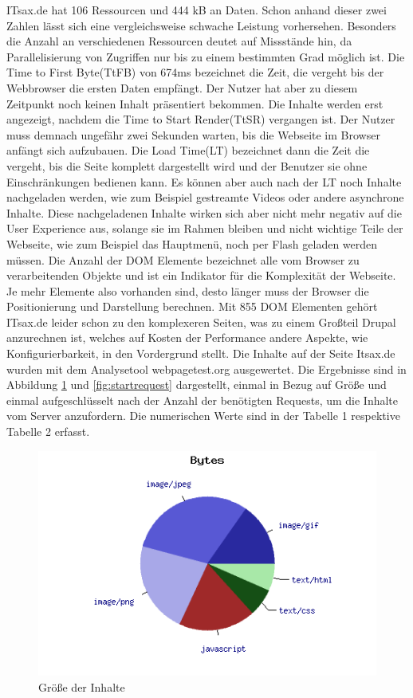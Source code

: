 ITsax.de hat 106 Ressourcen und 444 kB an Daten. Schon anhand dieser zwei Zahlen lässt sich eine vergleichsweise schwache Leistung vorhersehen. Besonders die Anzahl an verschiedenen Ressourcen deutet auf Missstände hin, da Parallelisierung von Zugriffen nur bis zu einem bestimmten Grad möglich ist. Die Time to First Byte(TtFB) von 674ms bezeichnet die Zeit, die vergeht bis der Webbrowser die ersten Daten empfängt. Der Nutzer hat aber zu diesem Zeitpunkt noch keinen Inhalt pr\"asentiert bekommen. Die Inhalte werden erst angezeigt, nachdem die Time to Start Render(TtSR) vergangen ist. Der Nutzer muss demnach ungefähr zwei Sekunden warten, bis die Webseite im Browser anfängt sich aufzubauen. Die Load Time(LT) bezeichnet dann die Zeit die vergeht, bis die Seite komplett dargestellt wird und der Benutzer sie ohne Einschränkungen bedienen kann. Es können aber auch nach der LT noch Inhalte nachgeladen werden, wie zum Beispiel gestreamte Videos oder andere asynchrone Inhalte. Diese nachgeladenen Inhalte wirken sich aber nicht mehr negativ auf die User Experience aus, solange sie im Rahmen bleiben und nicht wichtige Teile der Webseite, wie zum Beispiel das Hauptmenü, noch per Flash geladen werden müssen. Die Anzahl der DOM Elemente bezeichnet alle vom Browser zu verarbeitenden Objekte und ist ein Indikator für die Komplexität der Webseite. Je mehr Elemente also vorhanden sind, desto länger muss der Browser die Positionierung und Darstellung berechnen. Mit 855 DOM Elementen gehört ITsax.de leider schon zu den komplexeren Seiten, was zu einem Großteil Drupal anzurechnen ist, welches auf Kosten der Performance andere Aspekte, wie Konfigurierbarkeit, in den Vordergrund stellt. Die Inhalte auf der Seite Itsax.de wurden mit dem Analysetool webpagetest.org ausgewertet. Die Ergebnisse sind in Abbildung \ref{fig:startbyte} und \ref{fig:startrequest} dargestellt, einmal in Bezug auf Größe und einmal aufgeschlüsselt nach der Anzahl der benötigten Requests, um die Inhalte vom Server anzufordern. Die numerischen Werte sind in der Tabelle 1 respektive Tabelle 2 erfasst.
\begin{figure}[!ht]
  \centering
  \includegraphics[scale=0.5]{material/start_byte_pie.png}
  \caption{Größe der Inhalte}
  \label{fig:startbyte}
\end{figure}
